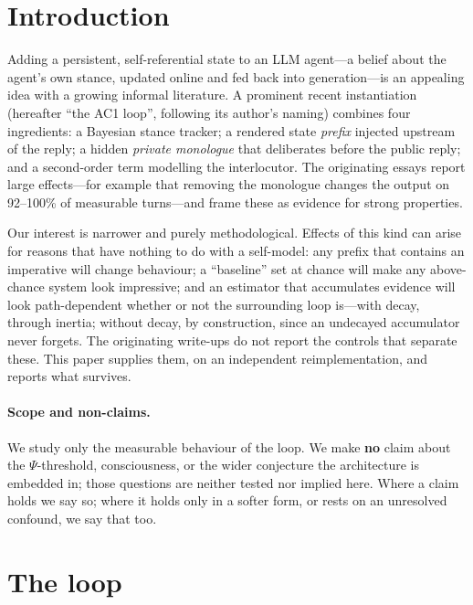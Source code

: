 \documentclass[11pt]{article}
\begin{document}
\section{Introduction}

Adding a persistent, self-referential state to an LLM agent---a belief about the
agent's own stance, updated online and fed back into generation---is an
appealing idea with a growing informal literature. A prominent recent
instantiation (hereafter ``the AC1 loop'', following its author's naming)
combines four ingredients: a Bayesian stance tracker; a rendered state
\emph{prefix} injected upstream of the reply; a hidden \emph{private monologue}
that deliberates before the public reply; and a second-order term modelling the
interlocutor. The originating essays report large effects---for example that
removing the monologue changes the output on 92--100\% of measurable turns---and
frame these as evidence for strong properties.

Our interest is narrower and purely methodological. Effects of this kind can
arise for reasons that have nothing to do with a self-model: any prefix that
contains an imperative will change behaviour; a ``baseline'' set at chance will
make any above-chance system look impressive; and an estimator that accumulates
evidence will look path-dependent whether or not the surrounding loop is---with
decay, through inertia; without decay, by construction, since an undecayed
accumulator never forgets. The originating
write-ups do not report the controls that separate these. This paper supplies
them, on an independent reimplementation, and reports what survives.

\paragraph{Scope and non-claims.} We study only the measurable behaviour of the
loop. We make \textbf{no} claim about the $\Psi$-threshold, consciousness, or the
wider conjecture the architecture is embedded in; those questions are neither
tested nor implied here. Where a claim holds we say so; where it holds only in a
softer form, or rests on an unresolved confound, we say that too.

\section{The loop}
\end{document}
